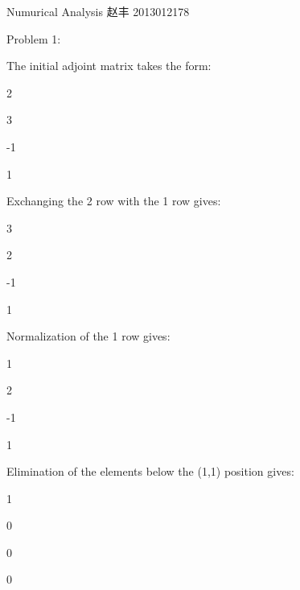 \documentclass{article}
\begin{document}
\bigskip Numurical Analysis 赵丰 2013012178

Problem 1:

The initial adjoint matrix takes the form:

2\qquad \TEXTsymbol{\vert}\qquad

3\qquad \TEXTsymbol{\vert}\qquad

-1\qquad \TEXTsymbol{\vert}\qquad

1\qquad \TEXTsymbol{\vert}\qquad

Exchanging the 2 row with the 1 row gives:

3\qquad \TEXTsymbol{\vert}\qquad

2\qquad \TEXTsymbol{\vert}\qquad

-1\qquad \TEXTsymbol{\vert}\qquad

1\qquad \TEXTsymbol{\vert}\qquad

Normalization of the 1 row gives:

1\qquad \TEXTsymbol{\vert}\qquad

2\qquad \TEXTsymbol{\vert}\qquad

-1\qquad \TEXTsymbol{\vert}\qquad

1\qquad \TEXTsymbol{\vert}\qquad

Elimination of the elements below the (1,1) position gives:

1\qquad \TEXTsymbol{\vert}\qquad

0\qquad \TEXTsymbol{\vert}\qquad

0\qquad \TEXTsymbol{\vert}\qquad

0\qquad \TEXTsymbol{\vert}\qquad
\end{document}
